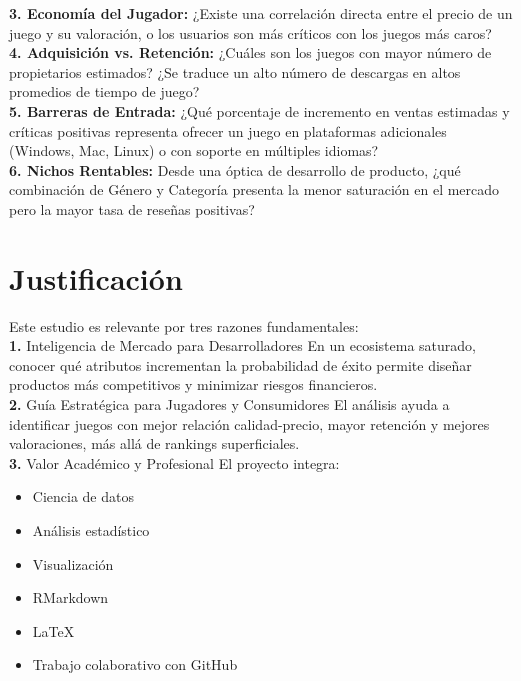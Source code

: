\documentclass[oneside,11pt]{Latex/Classes/PhDthesisPSnPDF}
\begin{document}
\textbf{3. Economía del Jugador:} ¿Existe una correlación directa entre
el precio de un juego y su valoración, o los usuarios son más críticos
con los juegos más caros?\\

\textbf{4. Adquisición vs. Retención:} ¿Cuáles son los juegos con mayor
número de propietarios estimados? ¿Se traduce un alto número de
descargas en altos promedios de tiempo de juego?\\

\textbf{5. Barreras de Entrada:} ¿Qué porcentaje de incremento en ventas
estimadas y críticas positivas representa ofrecer un juego en
plataformas adicionales (Windows, Mac, Linux) o con soporte en múltiples
idiomas?\\

\textbf{6. Nichos Rentables:} Desde una óptica de desarrollo de
producto, ¿qué combinación de Género y Categoría presenta la menor
saturación en el mercado pero la mayor tasa de reseñas positivas?

\section{Justificación}

Este estudio es relevante por tres razones fundamentales:\\

\textbf{1.} Inteligencia de Mercado para Desarrolladores En un
ecosistema saturado, conocer qué atributos incrementan la probabilidad
de éxito permite diseñar productos más competitivos y minimizar riesgos
financieros.\\

\textbf{2.} Guía Estratégica para Jugadores y Consumidores El análisis
ayuda a identificar juegos con mejor relación calidad-precio, mayor
retención y mejores valoraciones, más allá de rankings superficiales.\\

\textbf{3.} Valor Académico y Profesional El proyecto integra:

\begin{itemize}
\item
  Ciencia de datos
\item
  Análisis estadístico
\item
  Visualización
\item
  RMarkdown
\item
  LaTeX
\item
  Trabajo colaborativo con GitHub
\end{itemize}
\end{document}
